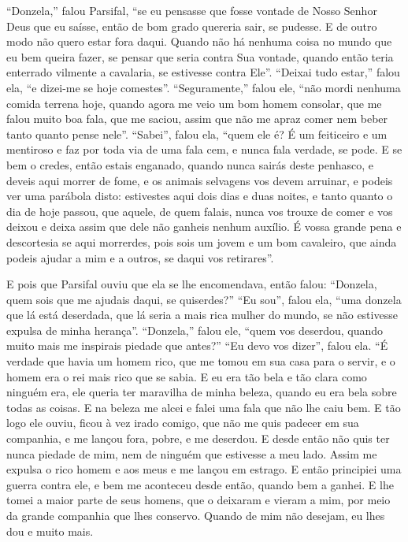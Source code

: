 “Donzela,” falou Parsifal, “se eu pensasse que fosse vontade de Nosso
Senhor Deus que eu saísse, então de bom grado quereria sair, se pudesse. E de
outro modo não quero estar fora daqui. Quando não há nenhuma coisa no mundo que
eu bem queira fazer, se pensar que seria contra Sua vontade, quando então teria
enterrado vilmente a cavalaria, se estivesse contra Ele”. “Deixai tudo
estar,” falou ela, “e dizei-me se hoje comestes”. “Seguramente,” falou ele,
“não mordi nenhuma comida terrena hoje, quando agora me veio um bom homem
consolar, que me falou muito boa fala, que me saciou, assim que não me apraz
comer nem beber tanto quanto pense nele”. “Sabei”, falou ela, ``quem ele é? É um
feiticeiro e um mentiroso e faz por toda via de uma fala cem, e nunca fala
verdade, se pode. E se bem o credes, então estais enganado, quando nunca sairás
deste penhasco, e deveis aqui morrer de fome, e os animais selvagens vos devem
arruinar, e podeis ver uma parábola disto: estivestes aqui dois dias e duas
noites, e tanto quanto o dia de hoje passou, que aquele, de quem falais, nunca
vos trouxe de comer e vos deixou  e deixa assim que dele não ganheis nenhum
auxílio. É vossa grande pena e descortesia se aqui morrerdes, pois sois um
jovem e um bom cavaleiro, que ainda podeis ajudar a mim e a outros, se daqui
vos retirares”.

E pois que Parsifal ouviu que ela se lhe encomendava, então falou:
“Donzela, quem sois que me ajudais daqui, se quiserdes?” “Eu sou”, falou ela,
“uma donzela que lá está deserdada, que lá seria a mais rica mulher do mundo,
se não estivesse expulsa de minha herança”. “Donzela,” falou ele, “quem vos
deserdou, quando muito mais me inspirais piedade que antes?” “Eu devo vos
dizer”, falou ela. “É verdade que havia um homem rico, que me tomou em sua casa
para o servir, e o homem era o rei mais rico que se sabia. E eu era tão bela e
tão clara como  ninguém era, ele queria ter maravilha de minha beleza, quando
eu era bela sobre todas as coisas. E na beleza me alcei e falei uma fala que
não lhe caiu bem. E tão logo ele ouviu, ficou à vez irado comigo, que não me
quis padecer em sua companhia, e me lançou fora, pobre, e me deserdou. E desde
então não quis ter nunca piedade de mim, nem de ninguém que estivesse a meu
lado. Assim me expulsa o rico homem e aos meus e me lançou em estrago. E então
principiei uma guerra contra ele, e bem me aconteceu desde então, quando bem a
ganhei. E lhe tomei a maior parte de seus homens, que o deixaram e vieram a
mim, por meio da grande companhia que lhes conservo. Quando de mim não desejam,
eu lhes dou e muito mais.

